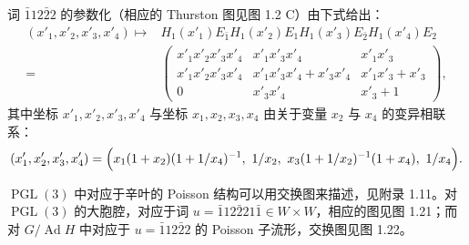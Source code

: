 词 $\bar112\bar22$ 的参数化（相应的 Thurston 图见图 1.2 C）由下式给出：
\[
\begin{aligned}
(x'_1,x'_2,x'_3,x'_4)\mapsto{}&H_1(x'_1)E_{\bar1}H_1(x'_2)E_1H_1(x'_3)E_{\bar2}H_1(x'_4)E_2\\
={}&\begin{pmatrix}
x'_1x'_2x'_3x'_4&x'_1x'_3x'_4&x'_1x'_3\\
x'_1x'_2x'_3x'_4&x'_1x'_3x'_4+x'_3x'_4&x'_1x'_3+x'_3\\
0&x'_3x'_4&x'_3+1
\end{pmatrix},
\end{aligned}
\]
其中坐标 $x'_1,x'_2,x'_3,x'_4$ 与坐标 $x_1,x_2,x_3,x_4$ 由关于变量 $x_2$ 与 $x_4$ 的变异相联系：
\[
(x'_1,x'_2,x'_3,x'_4)=\Bigl(x_1(1+x_2)(1+1/x_4)^{-1},\ 1/x_2,\ x_3(1+1/x_2)^{-1}(1+x_4),\ 1/x_4\Bigr).
\]

$\operatorname{PGL}(3)$ 中对应于辛叶的 Poisson 结构可以用交换图来描述，见附录 1.11。对 $\operatorname{PGL}(3)$ 的大胞腔，对应于词 $u=\bar112\bar221\bar1\in W\times W$，相应的图见图 1.21；而对 $G/\operatorname{Ad}H$ 中对应于 $u=\bar112\bar22$ 的 Poisson 子流形，交换图见图 1.22。

